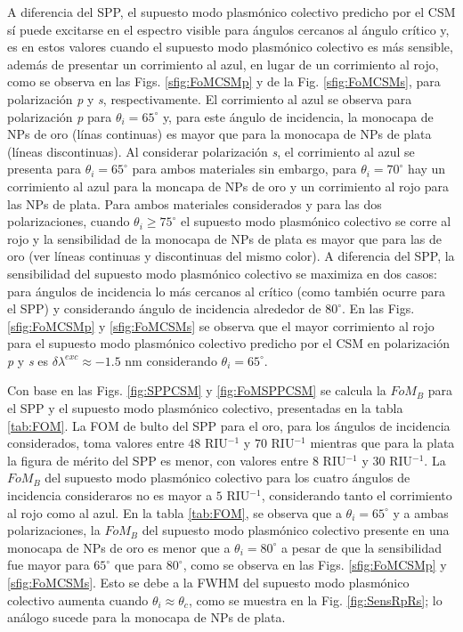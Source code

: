 A diferencia del SPP, el supuesto modo  plasmónico colectivo predicho por el CSM sí puede excitarse en el espectro visible para ángulos cercanos al ángulo crítico y, es en estos valores cuando el supuesto modo  plasmónico colectivo es más sensible, además de presentar un corrimiento al azul, en lugar de un corrimiento al rojo, como se observa en las Figs. \ref{sfig:FoMCSMp} y de la Fig. \ref{sfig:FoMCSMs}, para polarización \emph{p} y \emph{s}, respectivamente. El corrimiento al azul se observa para polarización \emph{p} para $\theta_i=65^\circ$ y, para este ángulo de incidencia, la monocapa de NPs de oro (línas continuas) es mayor que para la monocapa de NPs de plata (líneas discontinuas). Al considerar polarización \emph{s}, el corrimiento al azul se presenta para $\theta_i=65^\circ$ para ambos materiales sin embargo, para $\theta_i=70^\circ$ hay un corrimiento al azul para la moncapa de NPs de oro y un corrimiento al rojo para las NPs de plata. Para ambos materiales considerados y para las dos polarizaciones, cuando $\theta_i\geq 75^\circ$ el supuesto modo  plasmónico colectivo se corre al rojo y la sensibilidad de la monocapa de NPs de plata es mayor que para las de oro (ver líneas continuas y discontinuas del mismo color). A diferencia del SPP, la sensibilidad del supuesto modo  plasmónico colectivo se maximiza en dos casos: para ángulos de incidencia lo más cercanos al crítico (como también ocurre para el SPP)  y considerando ángulo de incidencia alrededor de $80^\circ$.   En las Figs. \ref{sfig:FoMCSMp} y \ref{sfig:FoMCSMs} se observa que el mayor corrimiento al rojo para el supuesto modo  plasmónico colectivo predicho por el CSM en polarización \emph{p} y \emph{s} es $\delta\lambda^{exc} \approx -1.5$ nm considerando $\theta_i=65^\circ$.

Con base en las Figs. \ref{fig:SPPCSM} y \ref{fig:FoMSPPCSM} se calcula la $\textit{FoM}_B$ para el SPP y el supuesto modo  plasmónico colectivo, presentadas en la tabla \ref{tab:FOM}. La FOM de bulto del SPP para el oro, para los ángulos de incidencia considerados, toma valores entre $48$ RIU$^{-1}$  y $70$ RIU$^{-1}$  mientras que para la plata la figura de mérito del SPP es menor, con valores entre $8$ RIU$^{-1}$ y $30$ RIU$^{-1}$. La $\textit{FoM}_B$ del supuesto modo  plasmónico colectivo para los cuatro ángulos de incidencia consideraros no es mayor a $5$ RIU$^{-1}$, considerando tanto el corrimiento al rojo como al azul. En la tabla \ref{tab:FOM}, se observa que a $\theta_i=65^\circ$ y a ambas polarizaciones, la $\textit{FoM}_B$ del supuesto modo  plasmónico colectivo presente en una monocapa de NPs de oro es menor que a $\theta_i=80^\circ$ a pesar de que la sensibilidad fue mayor para $65^\circ$ que para $80^\circ$, como se observa en las Figs. \ref{sfig:FoMCSMp} y \ref{sfig:FoMCSMs}. Esto se debe a la FWHM del supuesto modo  plasmónico colectivo aumenta cuando $\theta_i\approx\theta_c$, como se muestra en la Fig. \ref{fig:SensRpRs}; lo análogo sucede para la monocapa de NPs de plata. 

